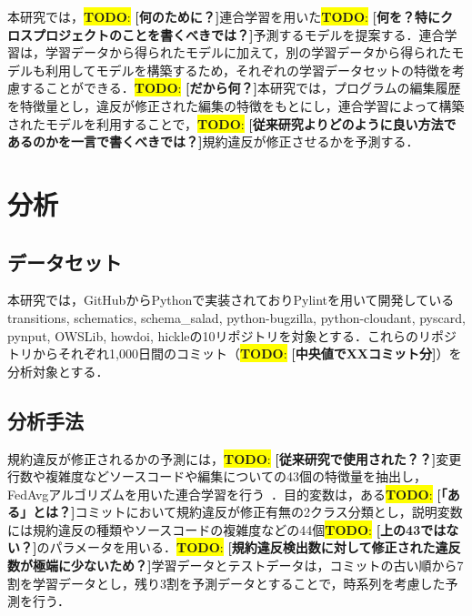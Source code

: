 \documentclass[uplatex,dvipdfmx,a4paper,twocolumn,base=11pt,jbase=11pt,ja=standard]{bxjsarticle}  %
\newcommand{\todo}[1]{\colorbox{yellow}{{\bf TODO}:}{\color{red} {\textbf{[#1]}}}}
\begin{document}
本研究では，\todo{何のために？}連合学習を用いた\todo{何を？特にクロスプロジェクトのことを書くべきでは？}予測するモデルを提案する．連合学習は，学習データから得られたモデルに加えて，別の学習データから得られたモデルも利用してモデルを構築するため，それぞれの学習データセットの特徴を考慮することができる．\todo{だから何？}本研究では，プログラムの編集履歴を特徴量とし，違反が修正された編集の特徴をもとにし，連合学習によって構築されたモデルを利用することで，\todo{従来研究よりどのように良い方法であるのかを一言で書くべきでは？}規約違反が修正させるかを予測する．

\section{分析}







\subsection{データセット}
本研究では，GitHubからPythonで実装されておりPylintを用いて開発しているtransitions, schematics, schema\_salad, python-bugzilla, python-cloudant, pyscard, pynput, OWSLib, howdoi, hickleの10リポジトリを対象とする．これらのリポジトリからそれぞれ1,000日間のコミット（\todo{中央値でXXコミット分}）を分析対象とする．

\subsection{分析手法}
規約違反が修正されるかの予測には，\todo{従来研究で使用された？？}変更行数や複雑度などソースコードや編集についての43個の特徴量を抽出し，FedAvgアルゴリズムを用いた連合学習を行う~\cite{article2}．目的変数は，ある\todo{「ある」とは？}コミットにおいて規約違反が修正有無の2クラス分類とし，説明変数には規約違反の種類やソースコードの複雑度などの44個\todo{上の43ではない？}のパラメータを用いる．\todo{規約違反検出数に対して修正された違反数が極端に少ないため？}学習データとテストデータは，コミットの古い順から7割を学習データとし，残り3割を予測データとすることで，時系列を考慮した予測を行う．
\end{document}
